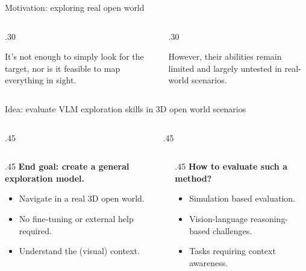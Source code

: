 \documentclass[final]{beamer}
\newlength{\colwidth}
\begin{document}
\begin{frame}[t]
\begin{columns}[t]
\begin{column}{\colwidth}
\begin{block}{Motivation: exploring real open world}
\begin{columns}[t,totalwidth=\colwidth]
\begin{column}{.30\colwidth}
\begin{center}
It's not enough to simply look for the target, nor is it feasible to map everything in sight.
\end{center}
\end{column}

\begin{column}{.30\colwidth}
\begin{center}
However, their abilities remain limited and largely untested in real-world scenarios.
\end{center}
\end{column}
\end{columns}
\end{block}


\begin{block}{Idea: evaluate VLM exploration skills in 3D open world scenarios}
\begin{columns}[t,totalwidth=\colwidth]
\begin{column}{.45\colwidth}
\begin{center}

\end{center}
\end{column}
\begin{column}{.45\colwidth}
\begin{center}

\end{center}
\end{column}
\end{columns}
\vspace{1cm}
\begin{columns}[t,totalwidth=\colwidth]
    \begin{column}{.45\colwidth}
    \textbf{End goal: create a general exploration model.}
    \begin{itemize}
        \item Navigate in a real 3D open world.
        \item No fine-tuning or external help required.
        \item Understand the (visual) context.
    \end{itemize}
    \end{column}
    \begin{column}{.45\colwidth}
    \textbf{How to evaluate such a method?}
    \begin{itemize}
        \item Simulation based evaluation.
        \item Vision-language reasoning-based challenges.
        \item Tasks requiring context awareness.
    \end{itemize}
    \end{column}
    \end{columns}
\end{block}


\end{column}
\end{columns}
\end{frame}
\end{document}
